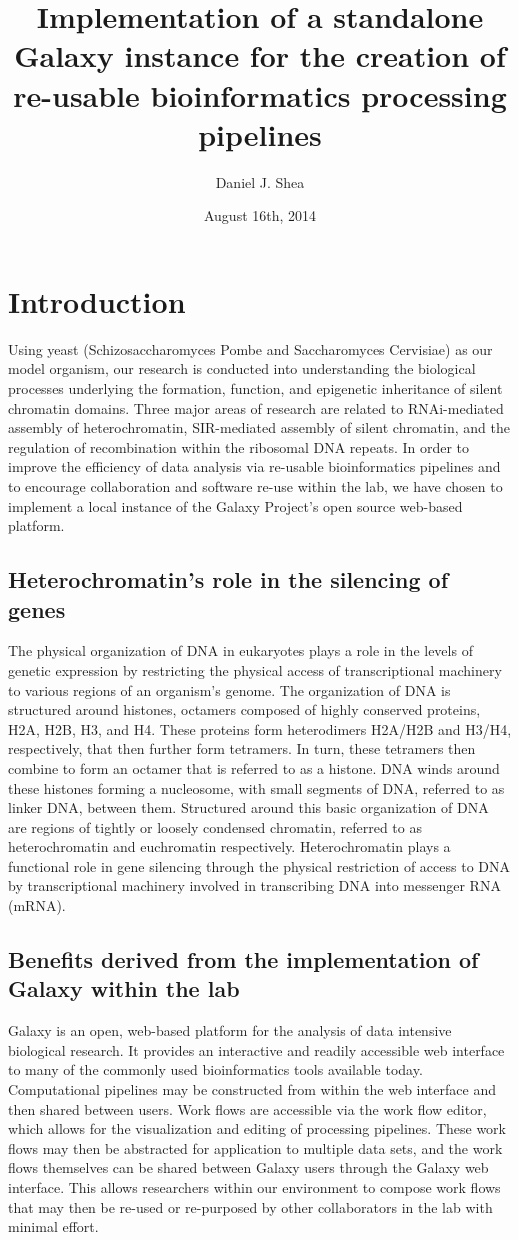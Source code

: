 \documentclass[a4paper,10pt]{article}
\title{Implementation of a standalone Galaxy instance for the creation of re-usable bioinformatics processing pipelines}
\author{Daniel J. Shea}
\date{August 16th, 2014}
\begin{document}
\maketitle
\pagebreak
\section{Introduction}
Using yeast (Schizosaccharomyces Pombe and Saccharomyces Cervisiae) as our model organism, our research is conducted into understanding the biological processes underlying the formation, function, and epigenetic inheritance of silent chromatin domains.  Three major areas of research are related to RNAi-mediated assembly of heterochromatin, SIR-mediated assembly of silent chromatin, and the regulation of recombination within the ribosomal DNA repeats.  In order to improve the efficiency of data analysis via re-usable bioinformatics pipelines and to encourage collaboration and software re-use within the lab, we have chosen to implement a local instance of the Galaxy Project's open source web-based platform.
\subsection{Heterochromatin's role in the silencing of genes}
The physical organization of DNA in eukaryotes plays a role in the levels of genetic expression by restricting the physical access of transcriptional machinery to various regions of an organism's genome.  The organization of DNA is structured around histones, octamers composed of highly conserved proteins, H2A, H2B, H3, and H4.  These proteins form heterodimers H2A/H2B and H3/H4, respectively, that then further form tetramers.  In turn, these tetramers then combine to form an octamer that is referred to as a histone.  DNA winds around these histones forming a nucleosome, with small segments of DNA, referred to as linker DNA, between them.  Structured around this basic organization of DNA are regions of tightly or loosely condensed chromatin, referred to as heterochromatin and euchromatin respectively.  Heterochromatin plays a functional role in gene silencing through the physical restriction of access to DNA by transcriptional machinery involved in transcribing DNA into messenger RNA (mRNA).
\subsection{Benefits derived from the implementation of Galaxy within the lab}
Galaxy is an open, web-based platform for the analysis of data intensive biological research.  It provides an interactive and readily accessible web interface to many of the commonly used bioinformatics tools available today.  Computational pipelines may be constructed from within the web interface and then shared between users.  Work flows are accessible via the work flow editor, which allows for the visualization and editing of processing pipelines.  These work flows may then be abstracted for application to multiple data sets, and the work flows themselves can be shared between Galaxy users through the Galaxy web interface.  This allows researchers within our environment to compose work flows that may then be re-used or re-purposed by other collaborators in the lab with minimal effort.
\end{document}
